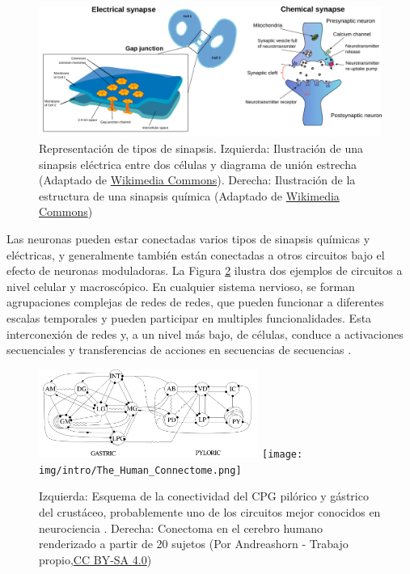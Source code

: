 \begin{figure}[hbt!]
	\centering
	\includegraphics[width=\linewidth]{img/intro/synapses.pdf}
	\caption{Representación de tipos de sinapsis. Izquierda: Ilustración de una sinapsis eléctrica entre dos células y diagrama de unión estrecha (Adaptado de \href{https://commons.wikimedia.org/wiki/File:Gap_cell_junction-en.svg}{Wikimedia Commons}). Derecha: Ilustración de la estructura de una sinapsis química (Adaptado de \href{https://commons.wikimedia.org/wiki/File:Synapse_diag1.svg}{Wikimedia Commons})}
	\label{fig:synapse-types spanish}
\end{figure}

Las neuronas pueden estar conectadas varios tipos de sinapsis químicas y eléctricas, y generalmente también están conectadas a otros circuitos bajo el efecto de neuronas moduladoras. La Figura \ref{fig:neural circuits spanish} ilustra dos ejemplos de circuitos a nivel celular y macroscópico. En cualquier sistema nervioso, se forman agrupaciones complejas de redes de redes, que pueden funcionar a diferentes escalas temporales y pueden participar en multiples funcionalidades. Esta interconexión de redes y, a un nivel más bajo, de células, conduce a activaciones secuenciales y transferencias de acciones en secuencias de secuencias \parencite{rabinovich_sequential_2020}.

\begin{figure}[hbt!]
	\centering
	\includegraphics[width=0.64\textwidth]{img/intro/cpg diagram.png}
	\texttt{[image: img/intro/The\_Human\_Connectome.png]}
	\caption{Izquierda: Esquema de la conectividad del CPG pilórico y gástrico del crustáceo, probablemente uno de los circuitos mejor conocidos en neurociencia \parencite{huerta_topology_2001}. Derecha: Conectoma en el cerebro humano renderizado a partir de 20 sujetos (Por Andreashorn - Trabajo propio,\href{https://commons.wikimedia.org/w/index.php?curid=41581320}{CC BY-SA 4.0})}
	\label{fig:neural circuits spanish}
\end{figure}

